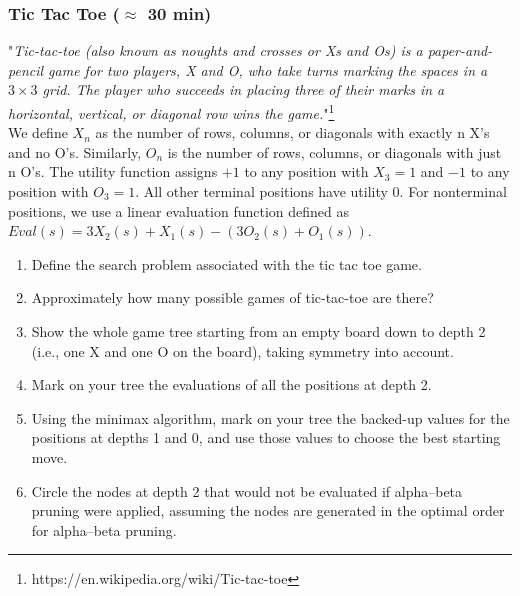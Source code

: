 \documentclass[a4paper, 10pt]{article}
\begin{document}
   \subsubsection{Tic Tac Toe ($\approx$ 30 min)}
   "\textit{Tic-tac-toe (also known as noughts and crosses or Xs and Os) is a paper-and-pencil game for two players, X and O, who take turns marking the spaces in a $3\times 3$ grid. The player who succeeds in placing three of their marks in a horizontal, vertical, or diagonal row wins the game.}"\footnote{https://en.wikipedia.org/wiki/Tic-tac-toe} \\
   We define $X_n$ as the number of rows, columns, or diagonals with exactly n X's and no O's. Similarly, $O_n$ is the number of rows, columns, or diagonals
with just n O's. The utility function assigns $+1$ to any position with $X_3 = 1$ and $-1$ to any
position with $O_3 = 1$. All other terminal positions have utility 0. For nonterminal positions,
we use a linear evaluation function defined as $Eval(s) = 3X_2(s)+X_1(s)-(3O_2(s)+O_1(s))$.\\
\begin{enumerate}
    \item Define the search problem associated with the tic tac toe game.
    \item Approximately how many possible games of tic-tac-toe are there?
    \item Show the whole game tree starting from an empty board down to depth 2 (i.e., one X
and one O on the board), taking symmetry into account.
    \item Mark on your tree the evaluations of all the positions at depth 2.
    \item Using the minimax algorithm, mark on your tree the backed-up values for the     positions at depths 1 and 0, and use those values to choose the best starting move.
    \item Circle the nodes at depth 2 that would not be evaluated if alpha–beta pruning were
applied, assuming the nodes are generated in the optimal order for alpha–beta pruning.
\end{enumerate}
\end{document}
